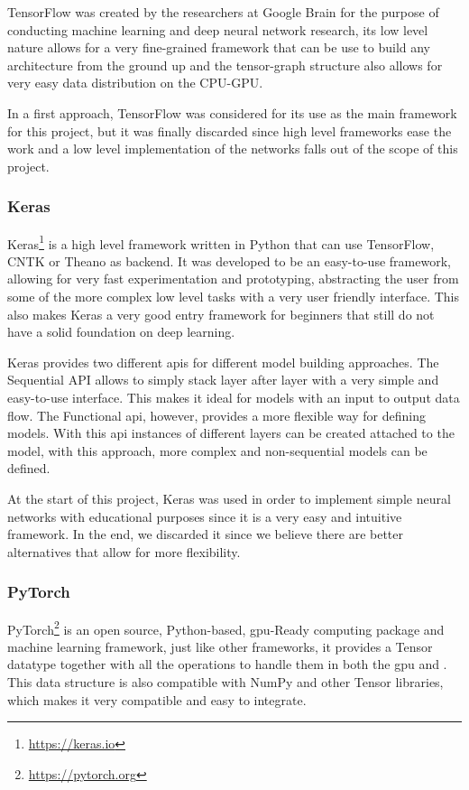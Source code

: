 TensorFlow was created by the researchers at Google Brain for the purpose of conducting machine learning and deep neural network research, its low level nature allows for a very fine-grained framework that can be use to build any architecture from the ground up and the tensor-graph structure also allows for very easy data distribution on the CPU-GPU.

In a first approach, TensorFlow was considered for its use as the main framework for this project, but it was finally discarded since high level frameworks ease the work and a low level implementation of the networks falls out of the scope of this project.

\subsubsection{Keras}
Keras\footnote{\url{https://keras.io}} is a high level framework written in Python that can use TensorFlow, CNTK or Theano as backend. It was developed to be an easy-to-use framework, allowing for very fast experimentation and prototyping, abstracting the user from some of the more complex low level tasks with a very user friendly interface. This also makes Keras a very good entry framework for beginners that still do not have a solid foundation on deep learning.

Keras provides two different \gls{api}s for different model building approaches. The Sequential API allows to simply stack layer after layer with a very simple and easy-to-use interface. This makes it ideal for models with an input to output data flow. The Functional \gls{api}, however, provides a more flexible way for defining models. With this \gls{api} instances of different layers can be created attached to the model, with this approach, more complex and non-sequential models can be defined.

At the start of this project, Keras was used in order to implement simple neural networks with educational purposes since it is a very easy and intuitive framework. In the end, we discarded it since we believe there are better alternatives that allow for more flexibility.

\subsubsection{PyTorch}
PyTorch\footnote{\url{https://pytorch.org}} is an open source, Python-based, \gls{gpu}-Ready computing package and machine learning framework, just like other frameworks, it provides a Tensor datatype together with all the operations to handle them in both the \gls{gpu} and . This data structure is also compatible with NumPy and other Tensor libraries, which makes it very compatible and easy to integrate.

